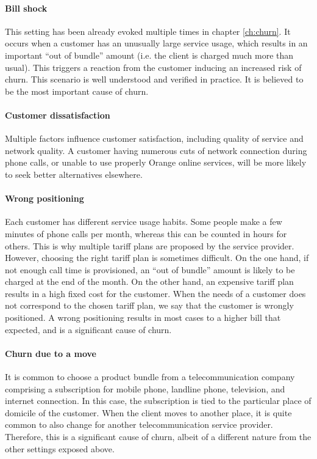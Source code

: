 \paragraph{Bill shock} This setting has been already evoked multiple times in
chapter \ref{ch:churn}. It occurs when a customer has an unusually large
service usage, which results in an important ``out of bundle'' amount (i.e. the
client is charged much more than usual). This triggers a reaction from the
customer inducing an increased risk of churn. This scenario is well understood
and verified in practice. It is believed to be the most important cause of
churn.

\paragraph{Customer dissatisfaction} Multiple factors influence customer
satisfaction, including quality of service and network quality. A
customer having numerous cuts of network connection during phone calls, or
unable to use properly Orange online services, will be more likely to seek
better alternatives elsewhere.

\paragraph{Wrong positioning} Each customer has different service usage habits.
Some people make a few minutes of phone calls per month, whereas this can be
counted in hours for others. This is why multiple tariff plans are proposed by
the service provider. However, choosing the right tariff plan is sometimes
difficult. On the one hand, if not enough call time is provisioned, an ``out of
bundle'' amount is likely to be charged at the end of the month. On the other
hand, an expensive tariff plan results in a high fixed cost for the customer.
When the needs of a customer does not correspond to the chosen tariff plan, we
say that the customer is wrongly positioned. A wrong positioning results in most
cases to a higher bill that expected, and is a significant cause of churn.

\paragraph{Churn due to a move} It is common to choose a product bundle from a
telecommunication company comprising a subscription for mobile phone, landline
phone, television, and internet connection. In this case, the subscription is
tied to the particular place of domicile of the customer. When the client moves
to another place, it is quite common to also change for another
telecommunication service provider. Therefore, this is a significant cause of
churn, albeit of a different nature from the other settings exposed above.


